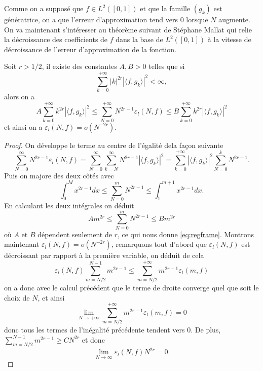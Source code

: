 Comme on a supposé que $f\in L^2([0, 1])$ et que la famille $(g_k)$ est génératrice, on a que l'erreur d'approximation tend vers $0$ lorsque $N$ augmente.
On va maintenant s'intéresser au théorème suivant de Stéphane Mallat qui relie la décroissance des coefficients de $f$ dans la base de $L^2([0, 1])$ à la vitesse de décroissance de l'erreur d'approximation de la fonction.
\begin{theoreme}
	Soit $r > 1/2$, il existe des constantes $A, B > 0$ telles que si 
	\begin{equation}
		\sum_{k=0}^{+\infty} |k|^{2r}|\langle f, g_k \rangle |^2 < \infty,
	\end{equation}
	alors on a 
	\begin{equation}\label{eq:regframe}
		A \sum_{k=0}^{+\infty} k^{2r}|\langle f, g_k \rangle |^2 \leq 
		\sum_{N=0}^{+\infty} N^{2r-1} \varepsilon_l(N, f) \leq
		B \sum_{k=0}^{+\infty} k^{2r} |\langle f, g_k\rangle |^2
	\end{equation}
	et ainsi on a $\varepsilon_l(N, f) = o(N^{-2r})$.
\end{theoreme}
\begin{proof}
	On développe le terme au centre de l'égalité dela façon suivante 
	\begin{equation*}
		\sum_{N=0}^{\infty} N^{2r-1} \varepsilon_l(N, f) =
		\sum_{N=0}^{\infty} \sum_{k=N}^{\infty} N^{2r-1} |\langle f, g_k \rangle |^2 =
		\sum_{k=0}^{+\infty} |\langle f, g_k \rangle |^2 \sum_{N=0}^{k} N^{2r-1}.
	\end{equation*}
	Puis on majore des deux côtés avec 
	\begin{equation}
		\int_{0}^M x^{2r-1} dx \leq \sum_{N=0}^m N^{2r-1} \leq \int_{1}^{m+1} x^{2r-1}dx.
	\end{equation}
	En calculant les deux intégrales on déduit 
	\begin{equation}
		A m^{2r} \leq \sum_{N=0}^{m} N^{2r-1} \leq B m^{2r}
	\end{equation}
	où $A$ et $B$ dépendent seulement de $r$, ce qui nous donne \ref{eq:regframe}.
	Montrons maintenant $\varepsilon_l(N, f) = o(N^{-2r})$, remarquons tout d'abord que $\varepsilon_l(N, f)$ est décroissant par rapport à la première variable, on déduit de cela
	\begin{equation*}
		\varepsilon_l(N, f)\sum_{m=N/2}^{N-1} m^{2r-1} \leq \sum_{m=N/2}^{+\infty} m^{2r-1} \varepsilon_l(m, f)
	\end{equation*}
	on a donc avec le calcul précédent que le terme de droite converge quel que soit le choix de $N$, et ainsi
	\begin{equation*}
		\lim_{N \to +\infty} \sum_{m=N/2}^{+\infty} m^{2r-1}\varepsilon_l(m, f) = 0
	\end{equation*}
	donc tous les termes de l'inégalité précédente tendent vers 0. 
	De plus, $\sum_{m = N/2}^{N-1} m^{2r-1} \geq CN^{2r}$ et donc
	\begin{equation*}
		\lim_{N\to \infty} \varepsilon_l(N, f)N^{2r} = 0.
	\end{equation*}
\end{proof}

